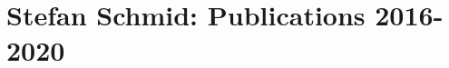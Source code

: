 \documentclass[8pt]{article}
\begin{document}

\section*{Stefan Schmid: Publications 2016-2020}
\end{document}
